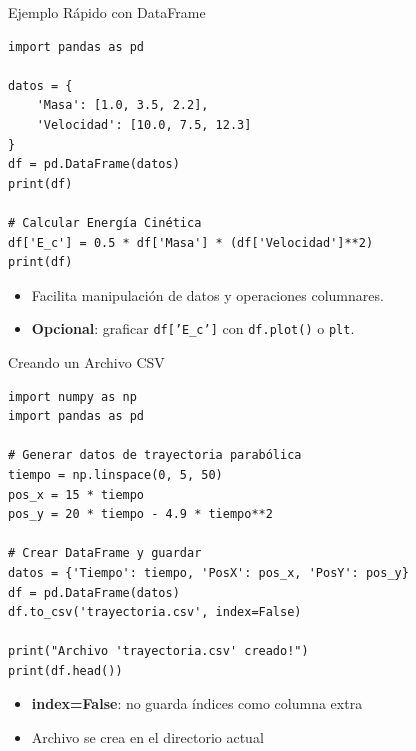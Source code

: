 \documentclass[10pt]{beamer}
\begin{document}
\begin{frame}[fragile]{Ejemplo Rápido con DataFrame}
\begin{verbatim}
import pandas as pd

datos = {
    'Masa': [1.0, 3.5, 2.2],
    'Velocidad': [10.0, 7.5, 12.3]
}
df = pd.DataFrame(datos)
print(df)

# Calcular Energía Cinética
df['E_c'] = 0.5 * df['Masa'] * (df['Velocidad']**2)
print(df)
\end{verbatim}
\begin{itemize}
  \item Facilita manipulación de datos y operaciones columnares.
  \item \textbf{Opcional}: graficar \texttt{df['E\_c']} con \texttt{df.plot()} o \texttt{plt}.
\end{itemize}
\end{frame}

\begin{frame}[fragile]{Creando un Archivo CSV}
\begin{verbatim}
import numpy as np
import pandas as pd

# Generar datos de trayectoria parabólica
tiempo = np.linspace(0, 5, 50)
pos_x = 15 * tiempo
pos_y = 20 * tiempo - 4.9 * tiempo**2

# Crear DataFrame y guardar
datos = {'Tiempo': tiempo, 'PosX': pos_x, 'PosY': pos_y}
df = pd.DataFrame(datos)
df.to_csv('trayectoria.csv', index=False)

print("Archivo 'trayectoria.csv' creado!")
print(df.head())
\end{verbatim}

\begin{itemize}
  \item \textbf{index=False}: no guarda índices como columna extra
  \item Archivo se crea en el directorio actual
\end{itemize}
\end{frame}


\end{document}
